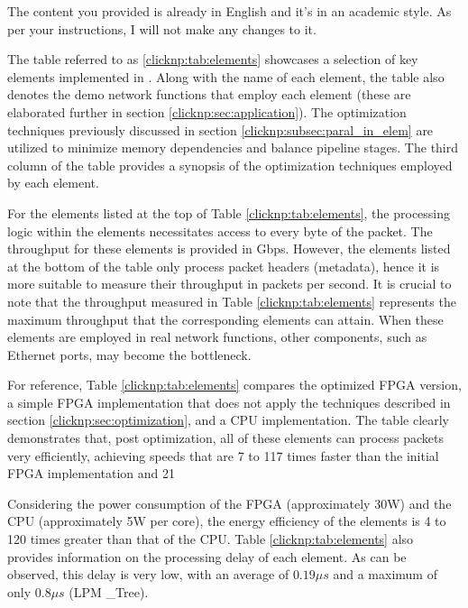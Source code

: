 The content you provided is already in English and it's in an academic style. As per your instructions, I will not make any changes to it.

The table referred to as \ref {clicknp:tab:elements} showcases a selection of key elements implemented in \name. Along with the name of each element, the table also denotes the demo network functions that employ each element (these are elaborated further in section \ref {clicknp:sec:application}). The optimization techniques previously discussed in section \ref {clicknp:subsec:paral_in_elem} are utilized to minimize memory dependencies and balance pipeline stages. The third column of the table provides a synopsis of the optimization techniques employed by each element. 

For the elements listed at the top of Table \ref {clicknp:tab:elements}, the processing logic within the elements necessitates access to every byte of the packet. The throughput for these elements is provided in Gbps. However, the elements listed at the bottom of the table only process packet headers (metadata), hence it is more suitable to measure their throughput in packets per second. It is crucial to note that the throughput measured in Table \ref {clicknp:tab:elements} represents the maximum throughput that the corresponding elements can attain. When these elements are employed in real network functions, other components, such as Ethernet ports, may become the bottleneck. 

For reference, Table \ref {clicknp:tab:elements} compares the optimized FPGA version, a simple FPGA implementation that does not apply the techniques described in section \ref {clicknp:sec:optimization}, and a CPU implementation. The table clearly demonstrates that, post optimization, all of these elements can process packets very efficiently, achieving speeds that are 7 to 117 times faster than the initial FPGA implementation and 21%

Considering the power consumption of the FPGA (approximately 30W) and the CPU (approximately 5W per core), the energy efficiency of the \name elements is 4 to 120 times greater than that of the CPU. Table \ref {clicknp:tab:elements} also provides information on the processing delay of each element. As can be observed, this delay is very low, with an average of $0.19 \mu s$ and a maximum of only $0.8 \mu s$ (LPM \_Tree).

